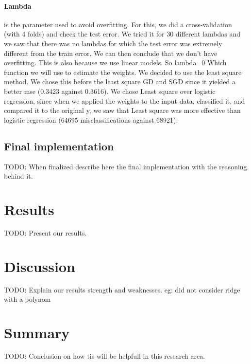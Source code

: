 \documentclass[10pt,conference,compsocconf]{IEEEtran}
\begin{document}
\paragraph{Lambda} is the parameter used to avoid overfitting. For this, we did a cross-validation (with 4 folds) and check the test error. We tried it for 30 different lambdas and we saw that there was no lambdas for which the test error was extremely different from the train error. We can then conclude that we don’t have overfitting. This is also because we use linear models. So lambda=0
 Which function we will use to estimate the weights. We decided to use the least square method. We chose this before the least square GD and SGD since it yielded a better mse (0.3423 against 0.3616). We chose Least square over logistic regression, since when we applied the weights to the input data, classified it, and compared it to the original y, we saw that Least square was more effective than logistic regression (64695 misclassifications against 68921).
\subsection{Final implementation}

TODO: When finalized describe here the final implementation with the reasoning behind it.

\section{Results}
TODO: Present our results.

\section{Discussion}
TODO: Explain our results strength and weaknesses.
eg: did not consider ridge with a polynom

\section{Summary}
TODO: Conclusion on how tis will be helpfull in this research area.



\end{document}
